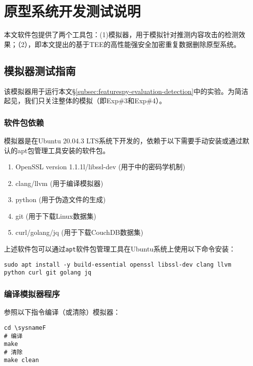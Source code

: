 \chapter{原型系统开发测试说明}

本文软件包提供了两个工具包：(1)\sysnameF 模拟器，用于模拟针对推测内容攻击的检测效果；（2）\prototype ，即本文提出的基于TEE的高性能强安全加密重复数据删除原型系统。

\section{\sysnameF 模拟器测试指南}
该模拟器用于运行本文\S\ref{subsec:featurespy-evaluation-detection}中的实验。为简洁起见，我们只关注整体\sysnameF 的模拟（即Exp\#3和Exp\#4）。

\subsection*{软件包依赖}

\sysnameF 模拟器是在Ubuntu 20.04.3 LTS系统下开发的，依赖于以下需要手动安装或通过默认的apt包管理工具安装的软件包。

\begin{enumerate}
    \item OpenSSL version 1.1.1l/libssl-dev (用于\sysnameF 中的密码学机制)
    \item clang/llvm (用于编译模拟器)
    \item python (用于伪造文件的生成)
    \item git (用于下载Linux数据集)
    \item curl/golang/jq (用于下载CouchDB数据集)
\end{enumerate}

上述软件包可以通过{\tt apt}软件包管理工具在Ubuntu系统上使用以下命令安装：

\begin{lstlisting}[style=shell]
sudo apt install -y build-essential openssl libssl-dev clang llvm python curl git golang jq
\end{lstlisting}

\subsection*{编译模拟器程序}

参照以下指令编译（或清除）\sysnameF 模拟器：

\begin{lstlisting}[style=shell]
cd \sysnameF
# 编译
make
# 清除
make clean
\end{lstlisting}

